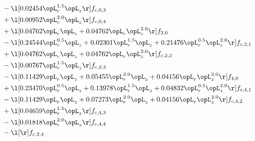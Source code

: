 \begin{alignat}{2}
& - \l[  0.02454 \opL_r^{1.5} \opL_z  \r] f_{c,0,3} \nonumber \\ 
& + \l[  0.00952 \opL_r^{2.0} \opL_z  \r] f_{c,0,4} \nonumber \\ 
& + \l[  0.04762 \opL_r \opL_z +  0.04762 \opL_r \opL_z^{2.0}  \r] f_{2,0} \nonumber \\ 
& - \l[  0.24544 \opL_r^{0.5} \opL_z +  0.02301 \opL_r^{1.5} \opL_z +  0.21476 \opL_r^{0.5} \opL_z^{2.0}  \r] f_{c,2,1} \nonumber \\ 
& + \l[  0.04762 \opL_r \opL_z +  0.04762 \opL_r \opL_z^{2.0}  \r] f_{c,2,2} \nonumber \\ 
& - \l[  0.00767 \opL_r^{1.5} \opL_z  \r] f_{c,2,3} \nonumber \\ 
& - \l[  0.11429 \opL_r \opL_z +  0.05455 \opL_r^{2.0} \opL_z +  0.04156 \opL_r \opL_z^{2.0}  \r] f_{4,0} \nonumber \\ 
& + \l[  0.23470 \opL_r^{0.5} \opL_z +  0.13978 \opL_r^{1.5} \opL_z +  0.04832 \opL_r^{0.5} \opL_z^{2.0}  \r] f_{c,4,1} \nonumber \\ 
& - \l[  0.11429 \opL_r \opL_z +  0.07273 \opL_r^{2.0} \opL_z +  0.04156 \opL_r \opL_z^{2.0}  \r] f_{c,4,2} \nonumber \\ 
& + \l[  0.04659 \opL_r^{1.5} \opL_z  \r] f_{c,4,3} \nonumber \\ 
& - \l[  0.01818 \opL_r^{2.0} \opL_z  \r] f_{c,4,4} \nonumber \\ 
& - \l[  \r] f_{c,2,4} \nonumber \\ 
\end{alignat} 


